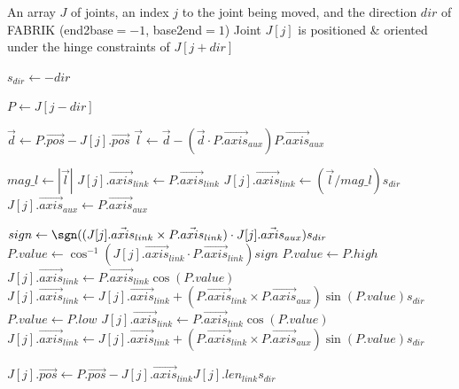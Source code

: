 \begin{algorithm}
\caption{Move Joint under Hinge Constraints}
\label{alg:move_hinge}
\footnotesize{
\begin{algorithmic}[1]
    \Require An array $J$ of joints, an index $j$ to the joint being moved, and the direction $dir$ of FABRIK (end2base$=-1$, base2end$=1$)
    \Ensure Joint $J[j]$ is positioned \& oriented under the hinge constraints of $J[j+dir]$

        \State $s_{dir}\gets -dir$
        \Statex

        \State $P\gets J[j-dir]$
        \Statex

        \State $\vec{d}\gets P.\vec{pos}-J[j].\vec{pos}$
        \State $\vec{l}\gets\vec{d}-(\vec{d}\cdot P.\vec{axis}_{aux})P.\vec{axis}_{aux}$
        \Statex

        \State $mag\_l \gets |\vec{l}|$
            \State $J[j].\vec{axis}_{link}\gets P.\vec{axis}_{link}$
        \Else
            \State $J[j].\vec{axis}_{link}\gets (\vec{l}/mag\_l)s_{dir}$
        \EndIf
        \State $J[j].\vec{axis}_{aux}\gets P.\vec{axis}_{aux}$
        \Statex

        \State $sign\gets\sgn((J[j].\vec{axis}_{link}\times P.\vec{axis}_{link})\cdot J[j].\vec{axis}_{aux})s_{dir}$
        \State $P.value\gets\cos^{-1}(J[j].\vec{axis}_{link}\cdot P.\vec{axis}_{link})sign$
                \State $P.value\gets P.high$
                \State $J[j].\vec{axis}_{link}\gets P.\vec{axis}_{link}\cos(P.value)$
                \State $J[j].\vec{axis}_{link}\gets J[j].\vec{axis}_{link}+(P.\vec{axis}_{link}\times P.\vec{axis}_{aux})\sin(P.value)s_{dir}$
                \State $P.value\gets P.low$
                \State $J[j].\vec{axis}_{link}\gets P.\vec{axis}_{link}\cos(P.value)$
                \State $J[j].\vec{axis}_{link}\gets J[j].\vec{axis}_{link}+(P.\vec{axis}_{link}\times P.\vec{axis}_{aux})\sin(P.value)s_{dir}$
            \EndIf
        \EndIf
        \Statex

        \State $J[j].\vec{pos}\gets P.\vec{pos}-J[j].\vec{axis}_{link}J[j].len_{link}s_{dir}$
    \EndFunction
\end{algorithmic}
}
\end{algorithm}

